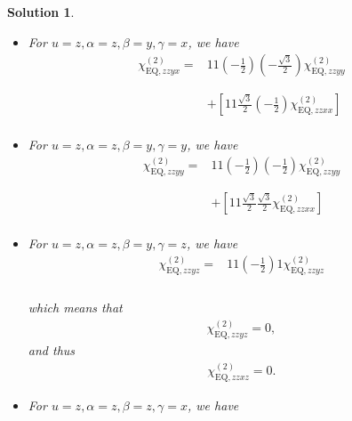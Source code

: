 \documentclass[UTF8,10pt,a4paper]{article}
\theoremstyle{Problem}
\theoremstyle{Solution}
\newtheorem*{sol}{Solution}
\begin{document}
\begin{sol}
\begin{itemize}
\footnotesize\begin{align}
\nonumber\chi_{\text{EQ},zzxz}^{(2)}=&11\left(-\frac{\sqrt{3}}{2}\right)1\chi_{\text{EQ},zzyz}^{(2)}\\
\nonumber&\\
\nonumber&\\
\nonumber&\\
&
\end{align}\normalsize
\item For $u=z,\alpha=z,\beta=y,\gamma=x$, we have
\footnotesize\begin{align}
\nonumber\chi_{\text{EQ},zzyx}^{(2)}=&11\left(-\frac{1}{2}\right)\left(-\frac{\sqrt{3}}{2}\right)\chi_{\text{EQ},zzyy}^{(2)}\\
\nonumber&\\
\nonumber&\\
\nonumber&+\left[11\frac{\sqrt{3}}{2}\left(-\frac{1}{2}\right)\chi_{\text{EQ},zzxx}^{(2)}\right]\\
&
\end{align}\normalsize
\item For $u=z,\alpha=z,\beta=y,\gamma=y$, we have
\footnotesize\begin{align}
\nonumber\chi_{\text{EQ},zzyy}^{(2)}=&11\left(-\frac{1}{2}\right)\left(-\frac{1}{2}\right)\chi_{\text{EQ},zzyy}^{(2)}\\
\nonumber&\\
\nonumber&\\
\nonumber&+\left[11\frac{\sqrt{3}}{2}\frac{\sqrt{3}}{2}\chi_{\text{EQ},zzxx}^{(2)}\right]\\
&
\end{align}\normalsize
\item For $u=z,\alpha=z,\beta=y,\gamma=z$, we have
\footnotesize\begin{align}
\nonumber\chi_{\text{EQ},zzyz}^{(2)}=&11\left(-\frac{1}{2}\right)1\chi_{\text{EQ},zzyz}^{(2)}\\
\nonumber&\\
\nonumber&\\
\nonumber&\\
&
\end{align}\normalsize
which means that
\begin{align}
    \chi_{\text{EQ},zzyz}^{(2)}=0,
\end{align}
and thus
\begin{align}
    \chi_{\text{EQ},zzxz}^{(2)}=0.
\end{align}
\item For $u=z,\alpha=z,\beta=z,\gamma=x$, we have

\end{itemize}
\end{sol}
\end{document}
